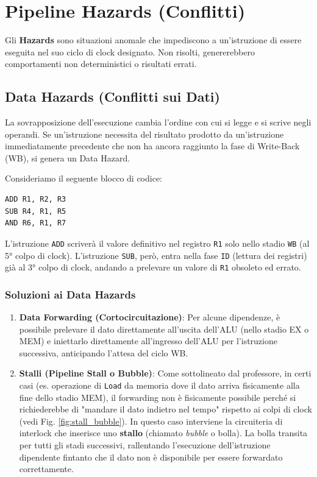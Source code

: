 \section{Pipeline Hazards (Conflitti)}
Gli \textbf{Hazards} sono situazioni anomale che impediscono a un'istruzione di essere eseguita nel suo ciclo di clock designato. Non risolti, genererebbero comportamenti non deterministici o risultati errati. 

\subsection{Data Hazards (Conflitti sui Dati)}
La sovrapposizione dell'esecuzione cambia l'ordine con cui si legge e si scrive negli operandi. 
Se un'istruzione necessita del risultato prodotto da un'istruzione immediatamente precedente che non ha ancora raggiunto la fase di Write-Back (WB), si genera un Data Hazard.

\begin{example}
Consideriamo il seguente blocco di codice:
\begin{verbatim}
ADD R1, R2, R3
SUB R4, R1, R5
AND R6, R1, R7
\end{verbatim}
L'istruzione \texttt{ADD} scriverà il valore definitivo nel registro \texttt{R1} solo nello stadio \texttt{WB} (al 5° colpo di clock). L'istruzione \texttt{SUB}, però, entra nella fase \texttt{ID} (lettura dei registri) già al 3° colpo di clock, andando a prelevare un valore di \texttt{R1} obsoleto ed errato.
\end{example}

\subsubsection{Soluzioni ai Data Hazards}
\begin{enumerate}
    \item \textbf{Data Forwarding (Cortocircuitazione)}: Per alcune dipendenze, è possibile prelevare il dato direttamente all'uscita dell'ALU (nello stadio EX o MEM) e iniettarlo direttamente all'ingresso dell'ALU per l'istruzione successiva, anticipando l'attesa del ciclo WB.
    \item \textbf{Stalli (Pipeline Stall o Bubble)}: 
    Come sottolineato dal professore, in certi casi (es. operazione di \texttt{Load} da memoria dove il dato arriva fisicamente alla fine dello stadio MEM), il forwarding non è fisicamente possibile perché si richiederebbe di "mandare il dato indietro nel tempo" rispetto ai colpi di clock (vedi Fig. \ref{fig:stall_bubble}). In questo caso interviene la circuiteria di interlock che inserisce uno \textbf{stallo} (chiamato \textit{bubble} o bolla). 
    La bolla transita per tutti gli stadi successivi, rallentando l'esecuzione dell'istruzione dipendente fintanto che il dato non è disponibile per essere forwardato correttamente.
\end{enumerate}

